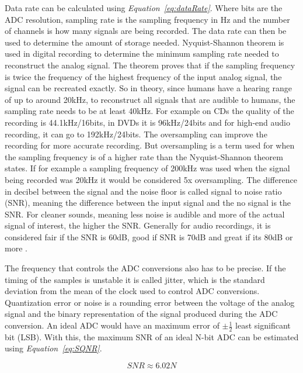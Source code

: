 Data rate can be calculated using \textit{Equation~\ref{eq:dataRate}}.
Where bits are the ADC resolution, sampling rate is the sampling frequency in Hz and the number of channels is how many signals are being recorded.
The data rate can then be used to determine the amount of storage needed.
Nyquist-Shannon theorem is used in digital recording to determine the minimum sampling rate needed to reconstruct the analog signal.
The theorem proves that if the sampling frequency is twice the frequency of the highest frequency of the input analog signal, the signal can be recreated exactly.%
So in theory, since humans have a hearing range of up to around 20kHz, to reconstruct all signals that are audible to humans, the sampling rate needs to be at least 40kHz.
For example on CDs the quality of the recording is 44.1kHz/16bits, in DVDs it is 96kHz/24bits and for high-end audio recording, it can go to 192kHz/24bits.
The oversampling can improve the recording for more accurate recording.
But oversampling is a term used for when the sampling frequency is of a higher rate than the Nyquist-Shannon theorem states.%
If for example a sampling frequency of 200kHz was used when the signal being recorded was 20kHz it would be considered 5x oversampling.
The difference in decibel between the signal and the noise floor is called signal to noise ratio (SNR), meaning the difference between the input signal and the no signal is the SNR.
For cleaner sounds, meaning less noise is audible and more of the actual signal of interest, the higher the SNR.
Generally for audio recordings, it is considered fair if the SNR is 60dB, good if SNR is 70dB and great if its 80dB or more \cite{bartlett_practical_2016}.

The frequency that controls the ADC conversions also has to be precise.
If the timing of the samples is unstable it is called jitter, which is the standard deviation from the mean of the clock used to control ADC conversions.
Quantization error or noise is a rounding error between the voltage of the analog signal and the binary representation of the signal produced during the ADC conversion.
An ideal ADC would have an maximum error of $\pm \frac{1}{2}$ least significant bit (LSB)\cite{kester_taking_nodate}.
With this, the maximum SNR of an ideal N-bit ADC can be estimated using \textit{Equation~\ref{eq:SQNR}}.

\begin{equation}\label{eq:SQNR}
    SNR \approx 6.02N
\end{equation}

